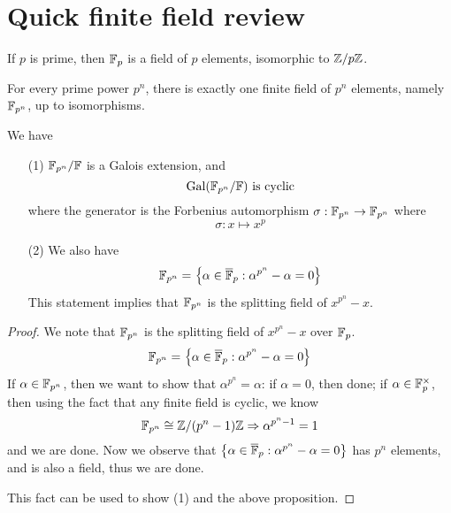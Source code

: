 \section{Quick finite field review}
If $p$ is prime, then $\mathbb{F}_p$ is a field of $p$ elements, isomorphic to $\mathbb{Z}/p\mathbb{Z}$.
\begin{prop}[Fact]
    For every prime power $p^n$, there is exactly one finite field of $p^n$ elements, namely $\mathbb{F}_{p^n}$, up to isomorphisms.
\end{prop}
\begin{thm}
    We have 
    \begin{itemize}
        \item[(1)] $\mathbb{F}_{p^n}/\mathbb{F}$ is a Galois extension, and 
        \begin{equation*}
            \text{Gal}(\mathbb{F}_{p^n}/\mathbb{F}) \text{ is cyclic}
        \end{equation*}
        where the generator is the Forbenius automorphism $\sigma: \mathbb{F}_{p^n}\to\mathbb{F}_{p^n}$ where 
        \begin{equation*}
            \sigma: x\mapsto x^p
        \end{equation*}
        \item[(2)] We also have 
        \begin{equation*}
            \mathbb{F}_{p^n}=\left\{\alpha\in\overline{\mathbb{F}}_p: \alpha^{p^n}-\alpha=0\right\}
        \end{equation*}
        This statement implies that $
        \mathbb{F}_{p^n}$ is the splitting field of $x^{p^n}-x$.
    \end{itemize}
    

\end{thm}
\begin{proof}
    We note that $\mathbb{F}_{p^n}$ is the splitting field of $x^{p^n}-x$ over $\mathbb{F}_p$.  
    \begin{equation*}
        \mathbb{F}_{p^n}=\left\{\alpha\in\overline{\mathbb{F}}_p: \alpha^{p^n}-\alpha=0\right\}
    \end{equation*}
    If $\alpha\in\mathbb{F}_{p^n}$, then we want to show that $\alpha^{p^n}=\alpha$: if $\alpha=0$, then done; if $\alpha\in\mathbb{F}_p^\times$, then using the fact that any finite field is cyclic, we know 
    \begin{equation*}
        \mathbb{F}_{p^n}\cong\mathbb{Z}/(p^n-1)\mathbb{Z}\Rightarrow \alpha^{p^n-1}=1
    \end{equation*}
    and we are done. Now we observe that 
   $ \left\{\alpha\in\overline{\mathbb{F}}_p: \alpha^{p^n}-\alpha=0\right\}$ has $p^n$ elements, and is also a field, thus we are done.

   This fact can be used to show (1) and the above proposition.
\end{proof}


